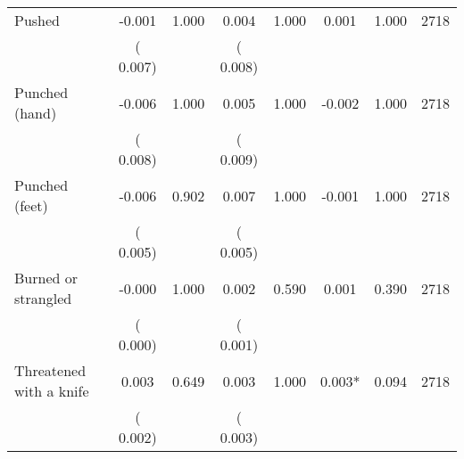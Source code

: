 \begin{tabular}{l*{7}{c}}
 Pushed       &             -0.001       &        1.000  &              0.004       &        1.000  &              0.001       &              1.000 &  2718 \\ 
                       &       (       0.007)             &                               &       (       0.008)                     &                               &                                               &                                &                      \\ 

 Punched (hand)       &             -0.006       &        1.000  &              0.005       &        1.000  &             -0.002       &              1.000 &  2718 \\ 
                       &       (       0.008)             &                               &       (       0.009)                     &                               &                                               &                                &                      \\ 

 Punched (feet)       &             -0.006       &        0.902  &              0.007       &        1.000  &             -0.001       &              1.000 &  2718 \\ 
                       &       (       0.005)             &                               &       (       0.005)                     &                               &                                               &                                &                      \\ 

 Burned or strangled       &             -0.000       &        1.000  &              0.002       &        0.590  &              0.001       &              0.390 &  2718 \\ 
                       &       (       0.000)             &                               &       (       0.001)                     &                               &                                               &                                &                      \\ 

 Threatened with a knife       &              0.003       &        0.649  &              0.003       &        1.000  &              0.003*       &              0.094 &  2718 \\ 
                       &       (       0.002)             &                               &       (       0.003)                     &                               &                                               &                                &                      \\ 


\end{tabular}
